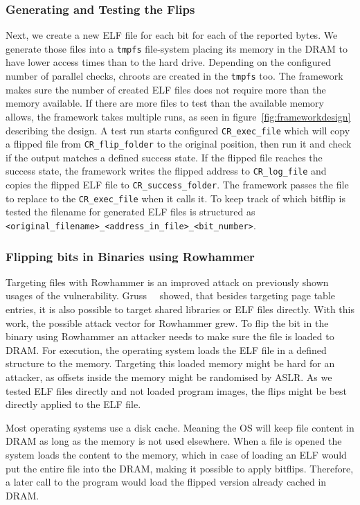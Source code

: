 \subsubsection{Generating and Testing the Flips}

Next, we create a new ELF file for each bit for each of the reported bytes. We
generate those files into a \texttt{tmpfs} file-system placing its memory in the
DRAM to have lower access times than to the hard drive. Depending on the
configured number of parallel checks, chroots are created in the \texttt{tmpfs}
too. The framework makes sure the number of created ELF files does not require
more than the memory available. If there are more files to test than the
available memory allows, the framework takes multiple runs, as seen in
figure~\ref{fig:frameworkdesign} describing the design. A test run starts
configured \texttt{CR\_exec\_file} which will copy a flipped file from
\texttt{CR\_flip\_folder} to the original position, then run it and check if the
output matches a defined success state. If the flipped file reaches the success
state, the framework writes the flipped address to \texttt{CR\_log\_file} and
copies the flipped ELF file to \texttt{CR\_success\_folder}. The framework
passes the file to replace to the \texttt{CR\_exec\_file} when it calls it. To
keep track of which bitflip is tested the filename for generated ELF files is
structured as \texttt{<original\_filename>\_<address\_in\_file>\_<bit\_number>}.

\subsubsection{Flipping bits in Binaries using Rowhammer}

Targeting files with Rowhammer is an improved attack on previously shown usages
of the vulnerability. Gruss~\etal~\cite{flipinthewall} showed, that besides
targeting page table entries, it is also possible to target shared libraries or
ELF files directly. With this work, the possible attack vector for Rowhammer
grew. To flip the bit in the binary using Rowhammer an attacker needs to make
sure the file is loaded to DRAM. For execution, the operating system loads the
ELF file in a defined structure to the memory. Targeting this loaded memory
might be hard for an attacker, as offsets inside the memory might be
randomised by ASLR. As we tested ELF files directly and not loaded program
images, the flips might be best directly applied to the ELF file.

Most operating systems use a disk cache. Meaning the OS will keep file content
in DRAM as long as the memory is not used elsewhere. When a file is opened the
system loads the content to the memory, which in case of loading an ELF would
put the entire file into the DRAM, making it possible to apply bitflips.
Therefore, a later call to the program would load the flipped version already
cached in DRAM.

